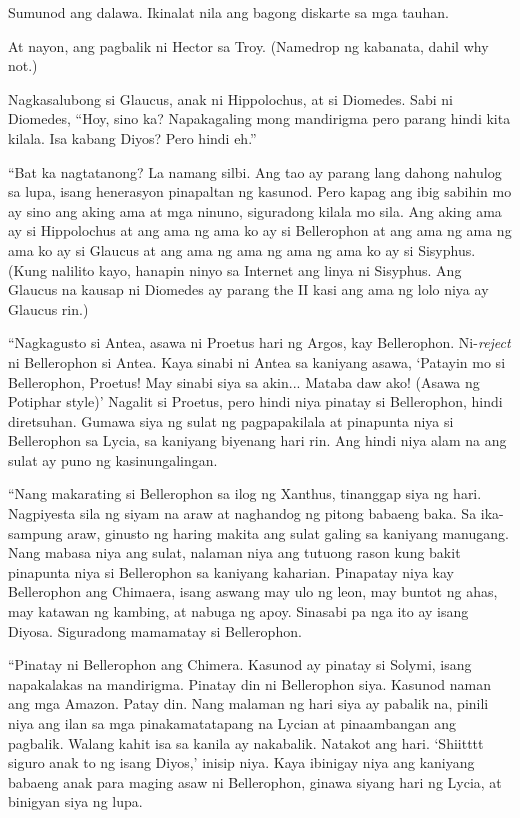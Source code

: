 \documentclass[12pt,letterpaper]{report}
\begin{document}
Sumunod ang dalawa. Ikinalat nila ang bagong diskarte sa mga tauhan.

At nayon, ang pagbalik ni Hector sa Troy. (Namedrop ng kabanata, dahil why not.)

Nagkasalubong si Glaucus, anak ni Hippolochus, at si Diomedes. Sabi ni Diomedes, ``Hoy, sino ka? Napakagaling mong mandirigma pero parang hindi kita kilala. Isa kabang Diyos? Pero hindi eh.''

``Bat ka nagtatanong? La namang silbi. Ang tao ay parang lang dahong nahulog sa lupa, isang henerasyon pinapaltan ng kasunod. Pero kapag ang ibig sabihin mo ay sino ang aking ama at mga ninuno, siguradong kilala mo sila. Ang aking ama ay si Hippolochus at ang ama ng ama ko ay si Bellerophon at ang ama ng ama ng ama ko ay si Glaucus at ang ama ng ama ng ama ng ama ko ay si Sisyphus. (Kung nalilito kayo, hanapin ninyo sa Internet ang linya ni Sisyphus. Ang Glaucus na kausap ni Diomedes ay parang the II kasi ang ama ng lolo niya ay Glaucus rin.)

``Nagkagusto si Antea, asawa ni Proetus hari ng Argos, kay Bellerophon. Ni-\textit{reject} ni Bellerophon si Antea. Kaya sinabi ni Antea sa kaniyang asawa, `Patayin mo si Bellerophon, Proetus! May sinabi siya sa akin...  Mataba daw ako! (Asawa ng Potiphar style)' Nagalit si Proetus, pero hindi niya pinatay si Bellerophon, hindi diretsuhan. Gumawa siya ng sulat ng pagpapakilala at pinapunta niya si Bellerophon sa Lycia, sa kaniyang biyenang hari rin. Ang hindi niya alam na ang sulat ay puno ng kasinungalingan.

``Nang makarating si Bellerophon sa ilog ng Xanthus, tinanggap siya ng hari. Nagpiyesta sila ng siyam na araw at naghandog ng pitong babaeng baka. Sa ika-sampung araw, ginusto ng haring makita ang sulat galing sa kaniyang manugang. Nang mabasa niya ang sulat, nalaman niya ang tutuong rason kung bakit pinapunta niya si Bellerophon sa kaniyang kaharian. Pinapatay niya kay Bellerophon ang Chimaera, isang aswang may ulo ng leon, may buntot ng ahas, may katawan ng kambing, at nabuga ng apoy. Sinasabi pa nga ito ay isang Diyosa. Siguradong mamamatay si Bellerophon.

``Pinatay ni Bellerophon ang Chimera. Kasunod ay pinatay si Solymi, isang napakalakas na mandirigma. Pinatay din ni Bellerophon siya. Kasunod naman ang mga Amazon. Patay din. Nang malaman ng hari siya ay pabalik na, pinili niya ang ilan sa mga pinakamatatapang na Lycian at pinaambangan ang pagbalik. Walang kahit isa sa kanila ay nakabalik. Natakot ang hari. `Shiitttt siguro anak to ng isang Diyos,' inisip niya. Kaya ibinigay niya ang kaniyang babaeng anak para maging asaw ni Bellerophon, ginawa siyang hari ng Lycia, at binigyan siya ng lupa.
\end{document}
